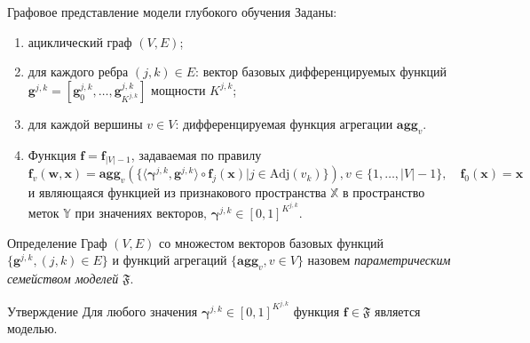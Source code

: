 \documentclass[usenames,dvipsnames,11pt,pdf,utf8,russian,aspectratio=43]{beamer}
\begin{document}
\begin{frame}{Графовое представление модели глубокого обучения}
\footnotesize
Заданы:
\begin{enumerate}
 \item ациклический граф $(V,E)$;
\item для каждого ребра $(j,k) \in E$: вектор базовых дифференцируемых функций  $\mathbf{g}^{j,k} = [\mathbf{g}^{j,k}_0, \dots, \mathbf{g}^{j,k}_{K^{j,k}}]$  мощности $K^{j,k}$;
\item для каждой вершины $v \in V$: дифференцируемая функция агрегации $\textbf{agg}_v$.
\item Функция $\mathbf{f} = \mathbf{f}_{|V|-1}$, задаваемая по правилу 
\begin{equation}
\label{eq:modelfam}
    \mathbf{f}_{v}(\mathbf{w}, \mathbf{x}) = \textbf{agg}_{v}\left(\{ \langle \boldsymbol{\gamma}^{j,k}, \mathbf{g}^{j,k} \rangle \circ  \mathbf{f}_j(\mathbf{x})| j \in \text{Adj}(v_k)\}\right), v \in \{1,\dots,|V|-1\}, \quad \mathbf{f}_0(\mathbf{x}) = \mathbf{x}
\end{equation}
и являющаяся функцией из признакового пространства $\mathbb{X}$ в пространство меток $\mathbb{Y}$ при значениях векторов, $\boldsymbol{\gamma}^{j,k} \in [0,1]^{K^{j,k}}$.
\end{enumerate}

\begin{block}{Определение}
Граф $(V, E)$ со множестом векторов базовых функций $\{\mathbf{g}^{j,k}, (j,k) \in E\}$ и функций агрегаций $\{ \textbf{agg}_v, {v \in V}\}$ назовем \textit{параметрическим семейством моделей} $\mathfrak{F}$.
\end{block}
\begin{block}{Утверждение}
Для любого значения $\boldsymbol{\gamma}^{j,k} \in [0,1]^{K^{j,k}}$ функция $\mathbf{f} \in \mathfrak{F}$ является моделью.
\end{block}
\end{frame}

      
\end{document}
